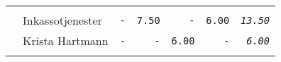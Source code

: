 \documentclass[11pt,A4paper,]{article}
\begin{document}
\begin{longtable}[]{@{}llrrrrr@{}}
\begin{minipage}[t]{0.14\columnwidth}
\end{minipage}\tabularnewline
\begin{minipage}[t]{0.14\columnwidth}\raggedright\strut
\strut
\end{minipage} & \begin{minipage}[t]{0.14\columnwidth}\raggedright\strut
Inkassotjenester\strut
\end{minipage} & \begin{minipage}[t]{0.14\columnwidth}\raggedleft\strut
\texttt{-}\strut
\end{minipage} & \begin{minipage}[t]{0.14\columnwidth}\raggedleft\strut
\texttt{7.50}\strut
\end{minipage} & \begin{minipage}[t]{0.14\columnwidth}\raggedleft\strut
\texttt{-}\strut
\end{minipage} & \begin{minipage}[t]{0.14\columnwidth}\raggedleft\strut
\texttt{6.00}\strut
\end{minipage} & \begin{minipage}[t]{0.14\columnwidth}\raggedleft\strut
\emph{\texttt{13.50}}\strut
\end{minipage}\tabularnewline
\begin{minipage}[t]{0.14\columnwidth}\raggedright\strut
\strut
\end{minipage} & \begin{minipage}[t]{0.14\columnwidth}\raggedright\strut
Krista Hartmann\strut
\end{minipage} & \begin{minipage}[t]{0.14\columnwidth}\raggedleft\strut
\texttt{-}\strut
\end{minipage} & \begin{minipage}[t]{0.14\columnwidth}\raggedleft\strut
\texttt{-}\strut
\end{minipage} & \begin{minipage}[t]{0.14\columnwidth}\raggedleft\strut
\texttt{6.00}\strut
\end{minipage} & \begin{minipage}[t]{0.14\columnwidth}\raggedleft\strut
\texttt{-}\strut
\end{minipage} & \begin{minipage}[t]{0.14\columnwidth}\raggedleft\strut
\emph{\texttt{6.00}}\strut
\end{minipage}\tabularnewline
\begin{minipage}[t]{0.14\columnwidth}\raggedright\strut
\strut
\end{minipage} & \begin{minipage}[t]{0.14\columnwidth}\raggedright\strut

\end{minipage}
\end{longtable}
\end{document}
